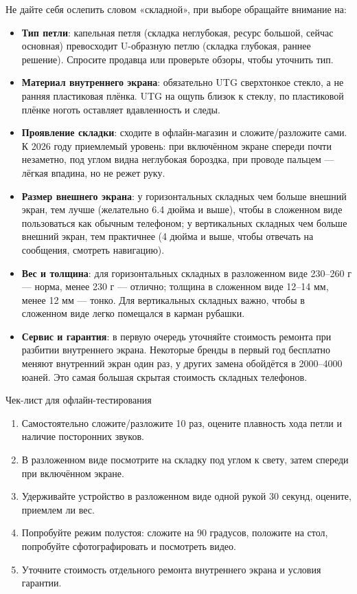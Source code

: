 Не дайте себя ослепить словом «складной», при выборе обращайте внимание на:

\begin{itemize}
  \item \textbf{Тип петли}: капельная петля (складка неглубокая, ресурс большой, сейчас основная) превосходит U-образную петлю (складка глубокая, раннее решение). Спросите продавца или проверьте обзоры, чтобы уточнить тип.
  \item \textbf{Материал внутреннего экрана}: обязательно UTG сверхтонкое стекло, а не ранняя пластиковая плёнка. UTG на ощупь близок к стеклу, по пластиковой плёнке ноготь оставляет вдавленность и следы.
  \item \textbf{Проявление складки}: сходите в офлайн-магазин и сложите/разложите сами. К 2026 году приемлемый уровень: при включённом экране спереди почти незаметно, под углом видна неглубокая бороздка, при проводе пальцем — лёгкая впадина, но не режет руку.
  \item \textbf{Размер внешнего экрана}: у горизонтальных складных чем больше внешний экран, тем лучше (желательно 6.4 дюйма и выше), чтобы в сложенном виде пользоваться как обычным телефоном; у вертикальных складных чем больше внешний экран, тем практичнее (4 дюйма и выше, чтобы отвечать на сообщения, смотреть навигацию).
  \item \textbf{Вес и толщина}: для горизонтальных складных в разложенном виде 230–260 г — норма, менее 230 г — отлично; толщина в сложенном виде 12–14 мм, менее 12 мм — тонко. Для вертикальных складных важно, чтобы в сложенном виде легко помещался в карман рубашки.
  \item \textbf{Сервис и гарантия}: в первую очередь уточняйте стоимость ремонта при разбитии внутреннего экрана. Некоторые бренды в первый год бесплатно меняют внутренний экран один раз, у других замена обойдётся в 2000–4000 юаней. Это самая большая скрытая стоимость складных телефонов.
\end{itemize}

\begin{tcbpractice}{Чек-лист для офлайн-тестирования}
\begin{enumerate}
  \item Самостоятельно сложите/разложите 10 раз, оцените плавность хода петли и наличие посторонних звуков.
  \item В разложенном виде посмотрите на складку под углом к свету, затем спереди при включённом экране.
  \item Удерживайте устройство в разложенном виде одной рукой 30 секунд, оцените, приемлем ли вес.
  \item Попробуйте режим полустоя: сложите на 90 градусов, положите на стол, попробуйте сфотографировать и посмотреть видео.
  \item Уточните стоимость отдельного ремонта внутреннего экрана и условия гарантии.
\end{enumerate}

\end{tcbpractice}

